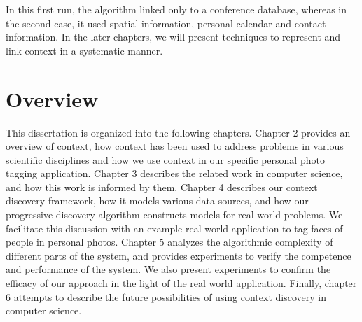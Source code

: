In this first run, the algorithm linked only to a conference database, whereas in the second case, it used spatial information, personal calendar and contact information. In the later chapters, we will present techniques to represent and link context in a systematic manner.

\section{Overview}
This dissertation is organized into the following chapters. Chapter 2 provides an overview of context, how context has been used to address problems in various scientific disciplines and how we use context in our specific personal photo tagging application. Chapter 3 describes the related work in computer science, and how this work is informed by them. Chapter 4 describes our context discovery framework, how it models various data sources, and how our progressive discovery algorithm constructs models for real world problems. We facilitate this discussion with an example real world application to tag faces of people in personal photos. Chapter 5 analyzes the algorithmic complexity of different parts of the system, and provides experiments to verify the competence and performance of the system. We also present experiments to confirm the efficacy of our approach in the light of the real world application. Finally, chapter 6 attempts to describe the future possibilities of using context discovery in computer science.





